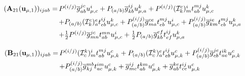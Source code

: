 \begin{subappendices}
    \begin{equation}
        \begin{array}{r@{\,}l}
            (\mathbf{A}_{21}(\mathbf{u}_{\mu,1}))_{ijab}
            =
            &
            P^{(i/j)}
            \overline{g}_{ab}^{jc}
            u_{\mu,c}^i
            +
            P_{(a/b)}
            \overline{g}_{kb}^{ij}
            u_{\mu,a}^k
            +
            P^{(i/j)}
            (\mathcal{I}_k^c)_m^i
            t_{ab}^{mj}
            u_{\mu,c}^k
            \\[5pt]
            &
            +
            P_{(a/b)}
            (\mathcal{I}_k^c)_a^e
            t_{eb}^{ij}
            u_{\mu,c}^k
            +
            P_{(a/b)}^{(i/j)}
            \overline{g}_{ma}^{ce}
            t_{eb}^{mj}
            u_{\mu,c}^i
            +
            P_{(a/b)}^{(i/j)}
            \overline{g}_{km}^{ie}
            t_{eb}^{mj}
            u_{\mu,a}^k
            \\[5pt]
            &
            +
            \tfrac{1}{2}
            P^{(i/j)}
            \overline{g}_{mn}^{jc}
            t_{ab}^{mn}
            u_{\mu,c}^i
            +
            \tfrac{1}{2}
            P_{(a/b)}
            \overline{g}_{kb}^{ef}
            t_{ef}^{ij}
            u_{\mu,a}^k
        \end{array}
    \end{equation}

    \begin{equation}
        \begin{array}{r@{\,}l}
            (\mathbf{B}_{21}(\mathbf{u}_{\mu,1}))_{ijab}
            =
            &
            P^{(i/j)}
            (\mathcal{I}_c^k)_m^i
            t_{ab}^{mj}
            u_{\mu,k}^c
            +
            P_{(a/b)}
            (\mathcal{I}_c^k)_a^e
            t_{eb}^{ij}
            u_{\mu,k}^c
            +
            P_{(a/b)}^{(i/j)}
            \overline{g}_{cb}^{je}
            t_{ae}^{ik}
            u_{\mu,k}^c
            \\[5pt]
            &
            +
            P_{(a/b)}^{(i/j)}
            \overline{g}_{kj}^{mb}
            t_{ac}^{im}
            u_{\mu,k}^c
            +
            \overline{g}_{mc}^{ij}
            t_{ab}^{km}
            u_{\mu,k}^c
            +
            \overline{g}_{ab}^{ke}
            t_{ce}^{ij}
            u_{\mu,k}^c
        \end{array}
    \end{equation}


\end{subappendices}
